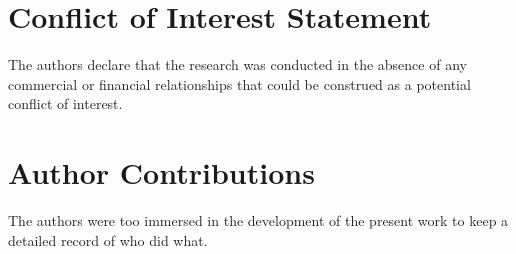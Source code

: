\documentclass[utf8]{FrontiersinHarvard_mod} %
\providecommand{\href}[2]{#2}
\renewcommand*{\|}[1][]{\nonscript\:#1\vert\nonscript\:\mathopen{}}
\begin{document}




\section*{Conflict of Interest Statement}

The authors declare that the research was conducted in the absence of any commercial or financial relationships that could be construed as a potential conflict of interest.

\section*{Author Contributions}

The authors were too immersed in the development of the present work to keep a detailed record of who did what.

\end{document}
